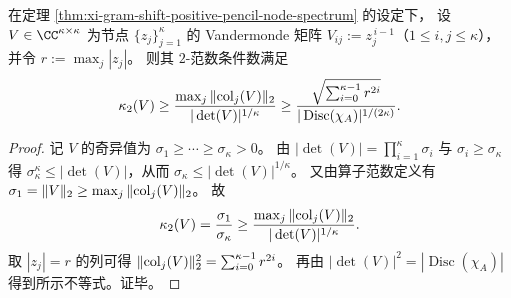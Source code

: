 \begin{proposition}\label{prop:xi-vandermonde-conditioning-lower-bound-disc}
在定理 \ref{thm:xi-gram-shift-positive-pencil-node-spectrum} 的设定下，
设 \(V\in\CC^{\kappa\times\kappa}\) 为节点 \(\{z_j\}_{j=1}^{\kappa}\) 的 Vandermonde 矩阵
\(
V_{ij}:=z_j^{\,i-1}
\)（\(1\le i,j\le \kappa\)），并令 \(r:=\max_j|z_j|\)。
则其 \(2\)-范数条件数满足
\[
\kappa_2(V)
\ge \frac{\max_j\|{\rm col}_j(V)\|_2}{|\det(V)|^{1/\kappa}}
\ge \frac{\sqrt{\sum_{i=0}^{\kappa-1}r^{2i}}}{|\operatorname{Disc}(\chi_A)|^{1/(2\kappa)}}.
\]
\end{proposition}
\begin{proof}
记 \(V\) 的奇异值为 \(\sigma_1\ge\cdots\ge\sigma_\kappa>0\)。
由 \(|\det(V)|=\prod_{i=1}^{\kappa}\sigma_i\) 与 \(\sigma_i\ge \sigma_\kappa\) 得
\(
\sigma_\kappa^\kappa\le |\det(V)|
\)，从而 \(\sigma_\kappa\le |\det(V)|^{1/\kappa}\)。
又由算子范数定义有 \(\sigma_1=\|V\|_2\ge \max_j\|{\rm col}_j(V)\|_2\)。
故
\[
\kappa_2(V)=\frac{\sigma_1}{\sigma_\kappa}\ge \frac{\max_j\|{\rm col}_j(V)\|_2}{|\det(V)|^{1/\kappa}}.
\]
取 \(|z_j|=r\) 的列可得 \(\|{\rm col}_j(V)\|_2^2=\sum_{i=0}^{\kappa-1}r^{2i}\)。
再由 \(|\det(V)|^2=|\operatorname{Disc}(\chi_A)|\) 得到所示不等式。证毕。
\end{proof}

